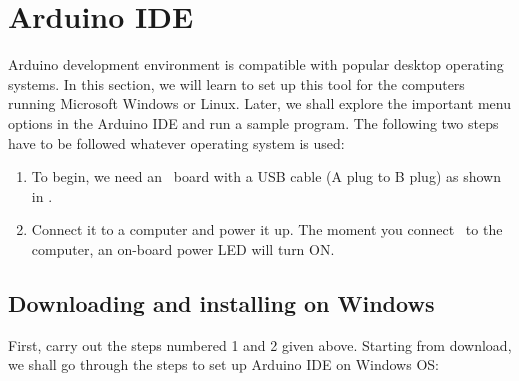 \section{Arduino IDE}\label{arduino-ide}
\label{sec:ard-start}
Arduino development environment is compatible with popular desktop
operating systems. In this section, we will learn to set up this tool
for the computers running Microsoft Windows or Linux. Later, we shall
explore the important menu options in the Arduino IDE and run a sample
program.  The following two steps have to be followed whatever operating
system is used:

\begin{enumerate}
      \item To begin, we need an \arduino\ board with a USB cable (A plug to
            B plug) as shown in .
      \item Connect it to a computer and power it up. The moment you connect \arduino\
            to the computer, an on-board power LED will turn ON.
\end{enumerate}

\subsection{Downloading and installing on Windows}
First, carry out the steps numbered 1 and 2 given above.
Starting from download, we shall go through the steps to set up
Arduino IDE on Windows OS:

